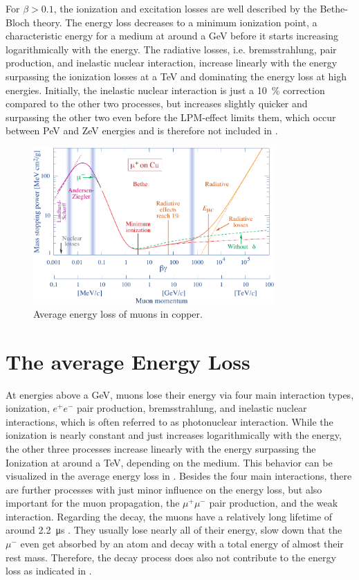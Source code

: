 For $\beta > \num{0.1}$, the ionization and excitation losses are well described by the Bethe-Bloch theory.
The energy loss decreases to a minimum ionization point, a characteristic energy for a medium at around a GeV before it starts increasing logarithmically with the energy.
The radiative losses, i.e. bremsstrahlung, pair production, and inelastic nuclear interaction, increase linearly with the energy surpassing the ionization losses at a TeV and dominating the energy loss at high energies.
Initially, the inelastic nuclear interaction is just a \SI{10}{\%} correction compared to the other two processes, but increases slightly quicker and surpassing the other two even before the LPM-effect limits them, which occur between PeV and ZeV energies and is therefore not included in .
\begin{figure}
    \centering
    \includegraphics[width=0.82\textwidth]{./images/muon_dedx_pdg.pdf}
    \caption{Average energy loss of muons in copper. \cite{PDG20}}
    \label{fig:dedx_pdg}
\end{figure}

%
%

\section{The average Energy Loss} \label{sec:dedx}

At energies above a GeV, muons lose their energy via four main interaction types, ionization, $e^+e^-$ pair production, bremsstrahlung, and inelastic nuclear interactions, which is often referred to as photonuclear interaction.
While the ionization is nearly constant and just increases logarithmically with the energy, the other three processes increase linearly with the energy surpassing the Ionization at around a TeV, depending on the medium.
This behavior can be visualized in the average energy loss in .
Besides the four main interactions, there are further processes with just minor influence on the energy loss, but also important for the muon propagation, the $\mu^+\mu^-$ pair production, and the weak interaction.
Regarding the decay, the muons have a relatively long lifetime of around \SI{2.2}{\micro\second} \cite{PDG20}.
They usually lose nearly all of their energy, slow down that the $\mu^-$ even get absorbed by an atom and decay with a total energy of almost their rest mass.
Therefore, the decay process does also not contribute to the energy loss as indicated in .


